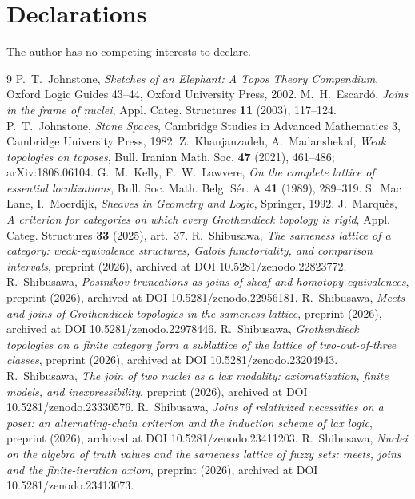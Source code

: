 \documentclass[11pt]{amsart}
\theoremstyle{definition}
\begin{document}
\section*{Declarations}
The author has no competing interests to declare.

\begin{thebibliography}{9}
 P.~T.~Johnstone, \emph{Sketches of an Elephant: A Topos
Theory Compendium}, Oxford Logic Guides 43--44, Oxford University Press, 2002.
 M.~H.~Escard\'o, \emph{Joins in the frame of nuclei}, Appl.
Categ. Structures \textbf{11} (2003), 117--124.
 P.~T.~Johnstone, \emph{Stone Spaces}, Cambridge
Studies in Advanced Mathematics 3, Cambridge University Press, 1982.
 Z.~Khanjanzadeh, A.~Madanshekaf, \emph{Weak topologies on
toposes}, Bull. Iranian Math. Soc. \textbf{47} (2021), 461--486;
arXiv:1808.06104.
 G.~M.~Kelly, F.~W.~Lawvere, \emph{On the complete lattice of
essential localizations}, Bull. Soc. Math. Belg. S\'er. A \textbf{41} (1989),
289--319.
 S.~Mac Lane, I.~Moerdijk, \emph{Sheaves in Geometry and Logic},
Springer, 1992.
 J.~Marqu\`es, \emph{A criterion for categories on which
every Grothendieck topology is rigid}, Appl. Categ. Structures \textbf{33}
(2025), art.\ 37.
 R.~Shibusawa, \emph{The sameness lattice of a category:
weak-equivalence structures, Galois functoriality, and comparison intervals},
preprint (2026), archived at DOI 10.5281/zenodo.22823772.
 R.~Shibusawa, \emph{Postnikov truncations as joins of sheaf
and homotopy equivalences}, preprint (2026), archived at DOI 10.5281/zenodo.22956181.
 R.~Shibusawa, \emph{Meets and joins of Grothendieck
topologies in the sameness lattice}, preprint (2026), archived at DOI
10.5281/zenodo.22978446.
 R.~Shibusawa, \emph{Grothendieck topologies on a finite
category form a sublattice of the lattice of two-out-of-three classes},
preprint (2026), archived at DOI 10.5281/zenodo.23204943.
 R.~Shibusawa, \emph{The join of two nuclei as a lax modality:
axiomatization, finite models, and inexpressibility}, preprint (2026),
archived at DOI 10.5281/zenodo.23330576.
 R.~Shibusawa, \emph{Joins of relativized necessities on a
poset: an alternating-chain criterion and the induction scheme of lax logic},
preprint (2026), archived at DOI 10.5281/zenodo.23411203.
 R.~Shibusawa, \emph{Nuclei on the algebra of truth values
and the sameness lattice of fuzzy sets: meets, joins and the
finite-iteration axiom}, preprint (2026), archived at DOI 10.5281/zenodo.23413073.
\end{thebibliography}
\end{document}
